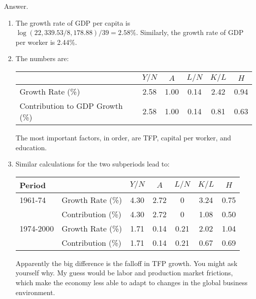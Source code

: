 \documentclass[letterpaper,12pt]{article}
\begin{document}
\begin{enumerate}
\begin{enumerate}
\end{enumerate}


Answer.  %
\begin{enumerate}

\item The growth rate of GDP per capita is
$\log(22,339.53/8,178.88)/39 = 2.58\%$. Similarly, the growth rate
of GDP per worker is 2.44\%.

\item  The numbers are:
%
\begin{center}
\begin{tabular}{lccccc}
\hline\hline
                                &     $Y/N$    &  $A$    &  $L/N$  & $K/L$    &  $H$   \\
\hline\hline
Growth Rate (\%)                &    2.58      &   1.00     &  0.14 & 2.42   & 0.94   \\
Contribution to GDP Growth (\%) &    2.58      &   1.00     &  0.14 & 0.81   & 0.63   \\
 \hline\hline
\end{tabular}
\end{center}
The most important factors, in order, are TFP, capital per worker,
and education.


\item Similar calculations for the two subperiods lead to:
%
\begin{center}
\begin{tabular}{llccccc}
\hline\hline
Period       &                                 &     $Y/N$      &  $A$      &  $L/N$     & $K/L$    &  $H$   \\
\hline\hline
1961-74      & Growth Rate (\%)                &    4.30      &   2.72     &  0    & 3.24   & 0.75   \\
             & Contribution (\%) &    4.30      &   2.72     &  0    & 1.08   & 0.50   \\
1974-2000    & Growth Rate (\%)                &    1.71      &   0.14     &  0.21 & 2.02   & 1.04   \\
             & Contribution (\%) &    1.71      &   0.14     &  0.21 & 0.67   & 0.69   \\
\hline\hline
\end{tabular}
\end{center}
Apparently the big difference is the falloff in TFP growth.
You might ask yourself why.  My guess would be 
labor and production market frictions, which make the economy
less able to adapt to changes in the global business environment.  


\end{enumerate}
\end{enumerate}
\end{document}
